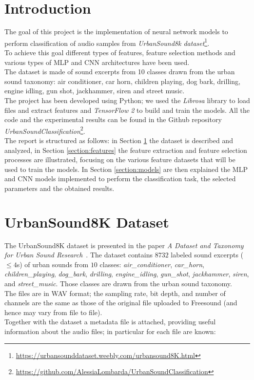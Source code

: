 \documentclass[oneside,openany]{article}
\begin{document}
    
    \section*{Introduction}
    The goal of this project is the implementation of neural network models to perform classification of audio samples from \textit{UrbanSound8k dataset}\footnote[1]{\url{https://urbansounddataset.weebly.com/urbansound8K.html}}.\\
    To achieve this goal different types of features, feature selection methods and various types of MLP and CNN architectures have been used.\\
    The dataset is made of sound excerpts from 10 classes drawn from the urban sound taxonomy: air conditioner, car horn, children playing, dog bark, drilling, engine idling, gun shot, jackhammer, siren and street music.\\
    The project has been developed using Python; we used the \textit{Librosa} library to load files and extract features and \textit{TensorFlow 2} to build and train the models.
    All the code and the experimental results can be found in the Github repository \textit{UrbanSoundClassification}\footnote[2]{\url{https://github.com/AlessiaLombarda/UrbanSoundClassification}}.\\
    The report is structured as follows: in Section \ref{section:dataset} the dataset is described and analyzed, in Section \ref{section:features} the feature extraction and feature selection processes are illustrated, focusing on the various feature datasets that will be used to train the models. In Section \ref{section:models} are then explained the MLP and CNN models implemented to perform the classification task, the selected parameters and the obtained results.
    
    \newpage
    \section{UrbanSound8K Dataset}
    \label{section:dataset}
    
    The UrbanSound8K dataset is presented in the paper \textit{A Dataset and Taxonomy for Urban Sound Research}~\cite{salamon2014dataset}. The dataset contains $8732$ labeled sound excerpts ($\leq4$s) of urban sounds from $10$ classes: \textit{air\_conditioner}, \textit{car\_horn}, \textit{children\_playing}, \textit{dog\_bark}, \textit{drilling}, \textit{engine\_idling}, \textit{gun\_shot}, \textit{jackhammer}, \textit{siren}, and \textit{street\_music}. Those classes are drawn from the urban sound taxonomy.\\
    The files are in WAV format; the sampling rate, bit depth, and number of channels are the same as those of the original file uploaded to Freesound (and hence may vary from file to file).\\
    Together with the dataset a metadata file is attached, providing useful information about the audio files; in particular for each file are known:
    
\end{document}
